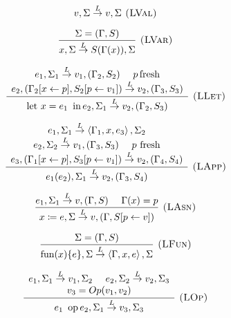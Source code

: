 \documentclass[english]{llncs}
\begin{document}
\begin{figure}[t!]
{\footnotesize{}}%
\begin{minipage}[t]{0.59\columnwidth}%
{\footnotesize{}
\[
v,\Sigma\overset{L}{\rightarrow}v,\Sigma\textsc{ (LVal)}
\]
}{\footnotesize \par}

{\footnotesize{}
\[
\frac{\Sigma=(\Gamma,S)}{x,\Sigma\overset{L}{\rightarrow}S(\Gamma(x)),\Sigma}\textsc{ (LVar)}
\]
}{\footnotesize \par}

{\footnotesize{}
\[
\frac{\begin{array}[t]{c}
e_{1},\Sigma_{1}\overset{L}{\rightarrow}v_{1},(\Gamma_{2},S_{2})\,\,\,\,\,\,\,\, p\,\mbox{fresh}\\
e_{2},(\Gamma_{2}[x\leftarrow p],S_{2}[p\leftarrow v_{1}])\overset{L}{\rightarrow}v_{2},(\Gamma_{3},S_{3})
\end{array}}{\mbox{let \ensuremath{x=e_{1}}\,\ in\,\ensuremath{e_{2}}},\Sigma_{1}\overset{L}{\rightarrow}v_{2},(\Gamma_{2},S_{3})}\textsc{ (LLet)}
\]
}{\footnotesize \par}

{\footnotesize{}
\[
\frac{\begin{array}[t]{c}
e_{1},\Sigma_{1}\overset{L}{\rightarrow}\left\langle \Gamma_{1},x,e_{3}\right\rangle ,\Sigma_{2}\\
e_{2},\Sigma_{2}\overset{L}{\rightarrow}v_{1},(\Gamma_{3},S_{3})\,\,\,\,\,\,\,\,\mbox{\ensuremath{p}\ fresh}\\
e_{3},(\Gamma_{1}[x\leftarrow p],S_{3}[p\leftarrow v_{1}])\overset{L}{\rightarrow}v_{2},(\Gamma_{4},S_{4})
\end{array}}{e_{1}(e_{2}),\Sigma_{1}\overset{L}{\rightarrow}v_{2},(\Gamma_{3},S_{4})}\textsc{ (LApp)}
\]
}{\footnotesize \par}

{\footnotesize{}
\[
\frac{e_{1},\Sigma_{1}\overset{L}{\rightarrow}v,(\Gamma,S)\,\,\,\,\,\,\,\,\Gamma(x)=p}{x\coloneqq e,\Sigma\overset{L}{\rightarrow}v,(\Gamma,S[p\leftarrow v])}\textsc{ (LAsn)}
\]
}{\footnotesize \par}

{\footnotesize{}
\[
\frac{\Sigma=(\Gamma,S)}{\mbox{fun(\ensuremath{x})\{\ensuremath{e}\}},\Sigma\overset{L}{\rightarrow}\left\langle \Gamma,x,e\right\rangle ,\Sigma}\textsc{ (LFun)}
\]
}{\footnotesize \par}

{\footnotesize{}
\[
\frac{\begin{array}[t]{c}
e_{1},\Sigma_{1}\overset{L}{\rightarrow}v_{1},\Sigma_{2}\,\,\,\,\,\,\,\, e_{2},\Sigma_{2}\overset{L}{\rightarrow}v_{2},\Sigma_{3}\\
v_{3}=Op(v_{1},v_{2})
\end{array}}{e_{1}\mbox{\,\ op\,}e_{2},\Sigma_{1}\overset{L}{\rightarrow}v_{3},\Sigma_{3}}\textsc{ (LOp)}
\]
}{\footnotesize \par}


\end{minipage}
\end{figure}
\end{document}
